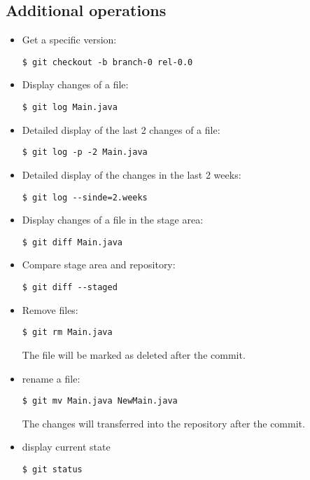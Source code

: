 \subsection{Additional operations}
\begin{itemize}
\item Get a specific version:
  \begin{lstlisting}
$ git checkout -b branch-0 rel-0.0
  \end{lstlisting}
\item Display changes of a file:
\begin{lstlisting}
$ git log Main.java
\end{lstlisting}
\item Detailed display of the last 2 changes of a file:
\begin{lstlisting}
$ git log -p -2 Main.java
\end{lstlisting}
\item Detailed display of the changes in the last 2 weeks:
\begin{lstlisting}
$ git log --sinde=2.weeks
\end{lstlisting}
\item Display changes of a file in the stage area:
\begin{lstlisting}
$ git diff Main.java
\end{lstlisting}
\item Compare stage area and repository:
\begin{lstlisting}
$ git diff --staged
\end{lstlisting}
\item Remove files:
\begin{lstlisting}
$ git rm Main.java
\end{lstlisting}
The file will be marked as deleted after the commit.
\item rename a file:
\begin{lstlisting}
$ git mv Main.java NewMain.java
\end{lstlisting}
The changes will transferred into the repository after the commit.
\item display current state
\begin{lstlisting}
$ git status
\end{lstlisting}
\end{itemize}
